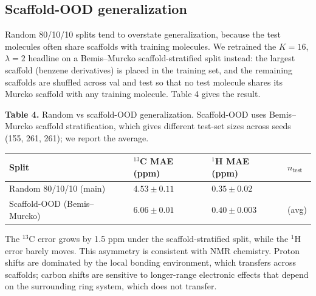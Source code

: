 \documentclass[
  11pt,
  a4paper,
]{article}
\newcounter{none} %
\begin{document}
\subsection*{Scaffold-OOD generalization}

Random 80/10/10 splits tend to overstate generalization, because the
test molecules often share scaffolds with training molecules. We
retrained the \(K = 16\), \(\lambda = 2\) headline on a Bemis--Murcko
scaffold-stratified split instead: the largest scaffold (benzene
derivatives) is placed in the training set, and the remaining
scaffolds are shuffled across val and test so that no test molecule
shares its Murcko scaffold with any training molecule. Table 4 gives
the result.

\textbf{Table 4.} Random vs scaffold-OOD generalization. Scaffold-OOD uses
Bemis--Murcko scaffold stratification, which gives different test-set
sizes across seeds (155, 261, 261); we report the average.

{\def\LTcaptype{none} %
\begin{longtable}[]{@{}
  >{\raggedright\arraybackslash}p{}
  >{\raggedright\arraybackslash}p{}
  >{\raggedright\arraybackslash}p{}
  >{\raggedright\arraybackslash}p{}@{}}
\toprule\noalign{}
\begin{minipage}[b]{\linewidth}\raggedright
Split
\end{minipage} & \begin{minipage}[b]{\linewidth}\raggedright
\(^{13}\)C MAE (ppm)
\end{minipage} & \begin{minipage}[b]{\linewidth}\raggedright
\(^{1}\)H MAE (ppm)
\end{minipage} & \begin{minipage}[b]{\linewidth}\raggedright
\(n_{\text{test}}\)
\end{minipage} \\
\midrule\noalign{}
\endhead
\bottomrule\noalign{}
\endlastfoot
Random 80/10/10 (main) & \(4.53 \pm 0.11\) & \(0.35 \pm 0.02\) & 155 \\
Scaffold-OOD (Bemis--Murcko) & \(6.06 \pm 0.01\) & \(0.40 \pm 0.003\) & 226 (avg) \\
\end{longtable}
}

The \(^{13}\)C error grows by 1.5 ppm under the scaffold-stratified
split, while the \(^{1}\)H error barely moves. This asymmetry is
consistent with NMR chemistry. Proton shifts are dominated by the
local bonding environment, which transfers across scaffolds; carbon
shifts are sensitive to longer-range electronic effects that depend
on the surrounding ring system, which does not transfer.
\end{document}
